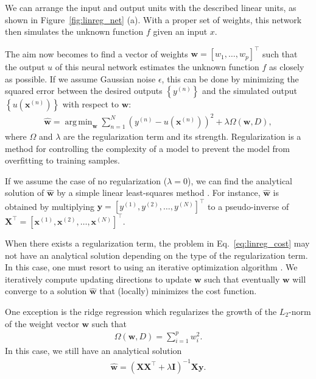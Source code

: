 \documentclass{now}
\newcommand{\vect}[1]{\mathbf{#1}}
\newcommand{\matr}[1]{\mathbf{#1}}
\newcommand{\vx}[0]{\vect{x}}
\newcommand{\vy}[0]{\vect{y}}
\newcommand{\vw}[0]{\vect{w}}
\newcommand{\mX}[0]{\matr{X}}
\newcommand{\mI}{\matr{I}}
\DeclareMathOperator*{\argmin}{arg\,min}
\begin{document}
We can arrange the input and output units with the described
linear units, as shown in Figure~\ref{fig:linreg_net} (a). With
a proper set of weights, this network then simulates
the unknown function $f$ given an input $x$. 

The aim now becomes to find a vector of weights $\vw = [w_1,
\dots, w_p]^\top$ such that the output $u$ of this neural
network estimates the unknown function $f$ as closely as
possible. If we assume Gaussian noise $\epsilon$, this can
be done by minimizing the squared error between the desired
outputs $\left\{ y^{(n)} \right\}$ and the simulated output
$\left\{ u(\vx^{(n)}) \right\}$ with respect to $\vw$:
\begin{align}
    \label{eq:linreg_cost}
    \hat{\vw} = \argmin_{\vw} \sum_{n=1}^N \left( y^{(n)}
    - u\left(\vx^{(n)}\right) \right)^2 + \lambda \Omega
    \left(\vw, D\right),
\end{align}
where $\Omega$ and $\lambda$ are the regularization term and
its strength. Regularization is a method for controlling the
complexity of a model to prevent the model from overfitting
to training samples.

If we assume the case of no regularization ($\lambda = 0$),
we can find the analytical solution of $\hat{\vw}$ by a
simple linear least-squares method \citep[see,
e.g.,][]{Golub1996}.  For instance, $\hat{\vw}$ is obtained
by multiplying $\vy = \left[y^{(1)}, y^{(2)}, \dots, y^{(N)}
\right]^\top$ to a pseudo-inverse of $\mX^\top = \left[
\vx^{(1)}, \vx^{(2)}, \dots, \vx^{(N)}\right]^\top$. 

When there exists a regularization term, the
problem in Eq.~\eqref{eq:linreg_cost} may not
have an analytical solution depending on the type of the
regularization term. In this case, one must resort to
using an iterative optimization algorithm \citep[see,
e.g.,][]{Fletcher1987}. We iteratively compute updating
directions to update $\vw$ such that eventually $\vw$ will
converge to a solution $\hat{\vw}$ that (locally) minimizes
the cost function.

One exception is the ridge regression which regularizes the
growth of the $L_2$-norm of the weight vector $\vw$ such
that
\begin{align*}
    \Omega(\vw, D) = \sum_{i=1}^p w_i^2.
\end{align*}
In this case, we still have an analytical solution
\begin{align*}
    \hat{\vw} = \left( \mX \mX^\top + \lambda \mI
    \right)^{-1} \mX \vy.
\end{align*}
\end{document}
